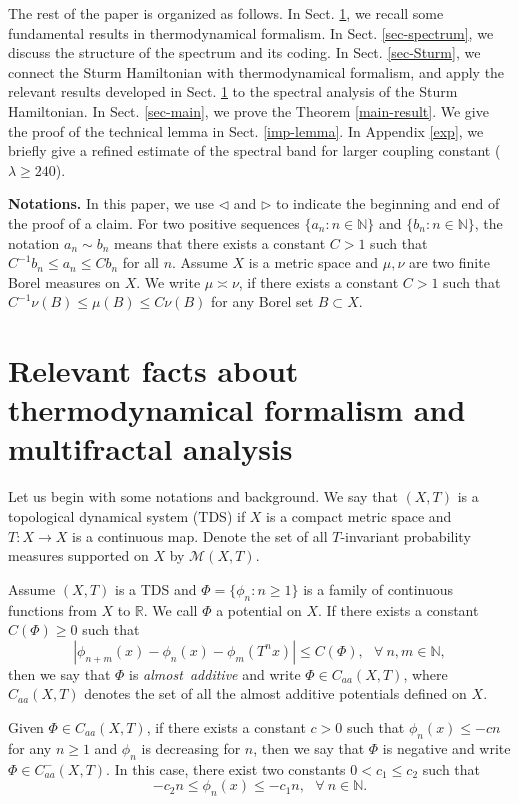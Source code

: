 \documentclass[reqno,11pt,graphicx,]{amsart}
\numberwithin{equation}{section}
\theoremstyle{plain}
\newcommand{\N}{{\mathbb N}}
\newcommand{\R}{{\mathbb R}}
\newcommand{\3}{\mathbf{3}}
\begin{document}
	\medskip
	The rest of the paper is organized as follows. In Sect. \ref{sec-TF}, we recall some fundamental results in thermodynamical formalism. In Sect. \ref{sec-spectrum}, we discuss the structure of the spectrum and its coding. In Sect. \ref{sec-Sturm}, we connect the Sturm Hamiltonian with thermodynamical formalism, and apply the relevant results developed in Sect. \ref{sec-TF} to the spectral analysis of the Sturm Hamiltonian. In Sect. \ref{sec-main}, we prove the Theorem \ref{main-result}. We give the proof of the technical lemma in Sect. \ref{imp-lemma}. In Appendix \ref{exp}, we briefly give a refined estimate of the spectral band for larger coupling constant ($\lambda\geq240$).
	
	{\bf Notations.} In this paper, we use $\lhd$ and $\rhd$ to indicate the beginning and end of the proof of a claim. For two positive sequences $\{a_n:n\in \N\}$ and $\{b_n:n\in \N\}$, the notation $
	a_n\sim b_n$ means that there exists a constant $C>1$ such that $C^{-1}b_n\leq a_n\le C b_n$ for all $n$. Assume $X$ is a metric space and $\mu,\nu$ are two finite Borel measures on $X$. We write $
	\mu\asymp \nu$, if there exists a constant $C>1$ such that $C^{-1}\nu(B)\le\mu(B)\le C\nu(B)$ for any Borel set $B\subset X$. 
	\section{Relevant facts about thermodynamical formalism and multifractal analysis}\label{sec-TF}
	
	Let us begin with some notations and background. We say that $(X,T)$ is a
	topological dynamical system (TDS) if $X$ is a compact metric space and $T:X\to X$ is a
	continuous map. Denote the set of all $T$-invariant probability measures supported on $X$ by $\mathcal{M}(X,T)$. 
	
	Assume $(X,T)$ is a TDS and $\Phi=\{\phi_n: n\geq1\}$ is a family of continuous
	functions from $X$ to $\R$. We call $\Phi$ a potential on $X$. If there exists a constant $%
	C(\Phi)\geq0$ such that 
	\begin{equation*}\label{almost-additive}
		|\phi_{n+m}(x)-\phi_{n}(x)-\phi_{m}(T^nx)|\leq C(\Phi),\ \ \ \forall\ n,m\in\N,
	\end{equation*}
	then we say  that $\Phi$ is {\it almost\ additive} and write $\Phi\in C_{aa}(X,T)$, where $C_{aa}(X,T)$ denotes the set of all the almost additive potentials defined on $X$. 
	
	Given $\Phi\in C_{aa}(X,T)$, if there exists a constant $c>0$ such that $%
	\phi_{n}(x)\leq -cn$ for any $n\geq1$ and $\phi_n$ is decreasing for $n$, then we say that $\Phi$
	is negative and write $\Phi\in C_{aa}^-(X,T)$. In this case, there exist two constants $0<c_1\leq c_2$ such that
	\begin{equation}\label{low-psi-upp}
		-c_2n\leq \phi_n(x)\leq-c_1n,\ \ \ \forall\ n\in\N.
	\end{equation}
	
\end{document}
